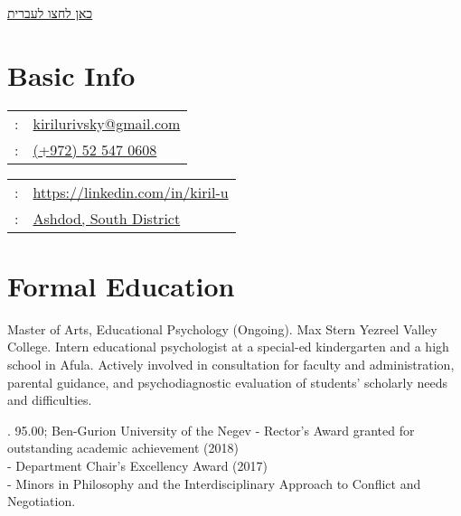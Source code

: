 \maketitle
\begin{minipage}[t]{0.25\textwidth}
{\footnotesize\hfill{}\color{gray}
%	
\hfill{}\hyperref[sec:basicinfoheb]{כאן לחצו לעברית} %
}
\end{minipage}
\setLTR
\section{Basic Info}
\label{sec:basicinfoeng}
\begin{minipage}[t]{.5\linewidth}
\begin{tabular}{rp{.75\linewidth}}
\baselineskip=20pt
\email{} :   & \href{mailto:kirilurivsky@gmail.com}{kirilurivsky@gmail.com}\\
\phone{} : &\href{tel:972525470608}{(+972) 52 547 0608} \\
\end{tabular}
\end{minipage}
\begin{minipage}[t]{.5\linewidth}
\begin{tabular}{rl}
\linkedin{} : &\href{https://www.linkedin.com/in/kiril-u}{https://linkedin.com/in/kiril-u}\\
\location{} : &\href{https://goo.gl/maps/MSacjpSy7vZSKykP7}{Ashdod, South District}                  
\end{tabular}
\end{minipage}
%
%
\section{Formal Education} %
 
{Master of Arts, Educational Psychology (Ongoing). Max Stern Yezreel Valley College.}
{Intern educational psychologist at a special-ed kindergarten and a high school in Afula. Actively involved in consultation for faculty and administration, parental guidance, and psychodiagnostic evaluation of students' scholarly needs and difficulties.}
{}

{\BA. 95.00; Ben-Gurion University of the Negev}
{- Rector's Award granted for outstanding academic achievement (2018) \\
- Department Chair’s Excellency Award (2017) \\
- Minors in Philosophy and the Interdisciplinary Approach to Conflict and Negotiation.}
{}

